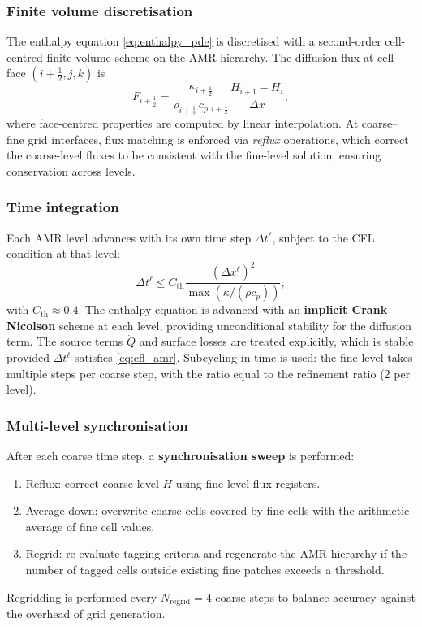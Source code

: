 \documentclass[12pt, a4paper]{article}
\begin{document}
\subsubsection{Finite volume discretisation}

The enthalpy equation \cref{eq:enthalpy_pde} is discretised with a
second-order cell-centred finite volume scheme on the AMR hierarchy.
The diffusion flux at cell face $(i+\tfrac{1}{2}, j, k)$ is
\begin{equation}
    F_{i+\frac{1}{2}} = \frac{\kappa_{i+\frac{1}{2}}}
                              {\rho_{i+\frac{1}{2}}\,c_{p,i+\frac{1}{2}}}
                        \frac{H_{i+1} - H_i}{\Delta x},
    \label{eq:fv_flux}
\end{equation}
where face-centred properties are computed by linear interpolation.  At
coarse--fine grid interfaces, flux matching is enforced via \emph{reflux}
operations, which correct the coarse-level fluxes to be consistent with
the fine-level solution, ensuring conservation across levels.

\subsubsection{Time integration}

Each AMR level advances with its own time step $\Delta t^\ell$, subject to
the CFL condition at that level:
\begin{equation}
    \Delta t^\ell \le C_\mathrm{th}
                    \frac{(\Delta x^\ell)^2}
                    {\max(\kappa/(\rho c_p))},
    \label{eq:cfl_amr}
\end{equation}
with $C_\mathrm{th} \approx 0.4$.  The enthalpy equation is advanced
with an \textbf{implicit Crank--Nicolson} scheme at each level, providing
unconditional stability for the diffusion term.  The source terms
$\dot{Q}$ and surface losses are treated explicitly, which is stable
provided $\Delta t^\ell$ satisfies \cref{eq:cfl_amr}.  Subcycling in
time is used: the fine level takes multiple steps per coarse step,
with the ratio equal to the refinement ratio (2 per level).

\subsubsection{Multi-level synchronisation}

After each coarse time step, a \textbf{synchronisation sweep} is
performed:
\begin{enumerate}[noitemsep]
    \item Reflux: correct coarse-level $H$ using fine-level flux registers.
    \item Average-down: overwrite coarse cells covered by fine cells with
          the arithmetic average of fine cell values.
    \item Regrid: re-evaluate tagging criteria and regenerate the AMR
          hierarchy if the number of tagged cells outside existing fine
          patches exceeds a threshold.
\end{enumerate}
Regridding is performed every $N_\mathrm{regrid} = 4$ coarse steps to
balance accuracy against the overhead of grid generation.
\end{document}
